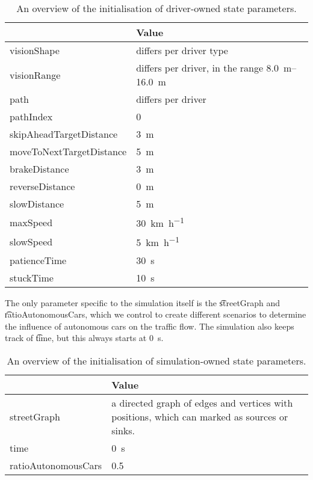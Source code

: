 \begin{table}
	\centering
	\begin{tabularx}{\textwidth}{>{\ttfamily}lX}
		\toprule
		\normalfont{Parameter}	& Value \\  
		\midrule
		visionShape 			
			& differs per driver type \\
		visionRange 			
			& differs per driver, in the range \SIrange{8.0}{16.0}{\meter} \\
		path
			& differs per driver \\
		pathIndex
			& 0 \\
		skipAheadTargetDistance
			& \si{3 \meter} \\
		moveToNextTargetDistance
			& \si{5 \meter} \\
		brakeDistance
			& \si{3 \meter} \\
		reverseDistance
			& \si{0 \meter} \\
		slowDistance
			& \si{5 \meter} \\
		maxSpeed
			& \si{30 \kilo\meter\per\hour}\\
		slowSpeed
			& \si{5 \kilo\meter\per\hour} \\
		patienceTime
			& \si{30 \second} \\
		stuckTime
			& \si{10 \second} \\
		\bottomrule
	\end{tabularx}
	\caption{An overview of the initialisation of driver-owned state parameters.}
	\label{tab:par:method:model:details:init:driver:value}
\end{table}


The only parameter specific to the simulation itself is the \t{streetGraph} and \t{ratioAutonomousCars}, which we control to create different scenarios to determine the influence of autonomous cars on the traffic flow. The simulation also keeps track of \t{time}, but this always starts at \si{0 \second}.

\begin{table}
	\centering
	\begin{tabularx}{\textwidth}{>{\ttfamily}lX}
		\toprule
		\normalfont{Parameter}	& Value \\  
		\midrule
		streetGraph
			& a directed graph of edges and vertices with positions, which can marked as sources or sinks. \\
		time 
			& \si{0 \second} \\
		ratioAutonomousCars
			& 0.5 \\
		\bottomrule
	\end{tabularx}
	\caption{An overview of the initialisation of simulation-owned state parameters.}
	\label{tab:par:method:model:details:init:simulation:value}
\end{table}

